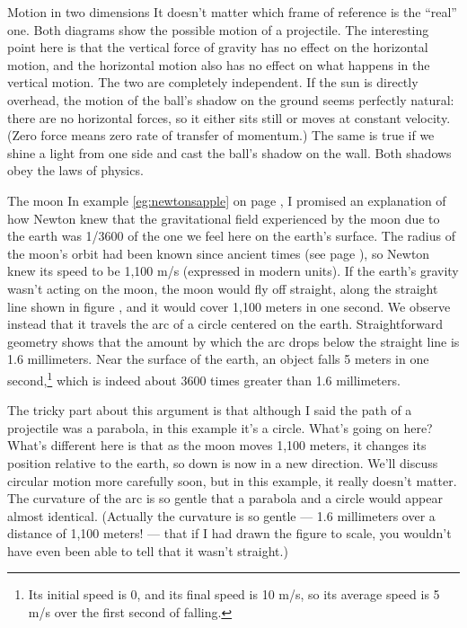 \begin{envsubsection}{Motion in two dimensions}
It doesn't matter which frame of reference is the ``real'' one. Both diagrams
show the possible motion of a projectile. The interesting point here is that the vertical
force of gravity has no effect on the horizontal motion, and the horizontal motion also
has no effect on what happens in the vertical motion. The two are completely independent.
If the sun is directly overhead, the motion of the ball's shadow on the ground seems perfectly
natural: there are no horizontal forces, so it either sits still or moves at constant
velocity. (Zero force means zero rate of transfer of momentum.) The same is true if we shine
a light from one side and cast the ball's shadow on the wall. Both shadows obey the laws
of physics.

\begin{eg}{The moon}\label{eg:moonorbit}
In example \ref{eg:newtonsapple} on page \pageref{eg:newtonsapple}, I promised an
explanation of how Newton knew that the gravitational field experienced by the moon
due to the earth was 1/3600 of the one we feel here on the earth's surface.
The radius of the moon's orbit had been known since ancient times
(see page \pageref{hipparchusmoondistance}), 
so Newton knew its speed to be 1,100 m/s (expressed in modern units).
If the earth's gravity wasn't acting on the moon, the moon would fly off straight,
along the straight line shown in figure , and it
would cover 1,100 meters in one second. We observe instead
that it travels the arc of a circle centered on the earth. Straightforward
geometry shows that the amount by which the arc drops below the straight line
is 1.6 millimeters. Near the surface of the earth, an object falls 5 meters
in one second,\footnote{Its initial speed is 0, and its final speed is 10 m/s, so its
average speed is 5 m/s over the first second of falling.} which is
indeed about 3600 times greater than 1.6 millimeters.

\vfill\pagebreak[4]

The tricky part about this argument is that although I said the path of a projectile
was a parabola, in this example it's a circle. What's going on here? What's different
here is that as the moon moves 1,100 meters, it changes its position relative to the
earth, so down is now in a new direction. We'll discuss circular motion more
carefully soon, but in this example, it really doesn't matter. The curvature of the
arc is so gentle that a parabola and a circle would appear almost identical. (Actually
the curvature is so gentle --- 1.6 millimeters over a distance of 1,100 meters! --- that
if I had drawn the figure to scale, you wouldn't have even been able to tell that it
wasn't straight.)


\end{eg}
\end{envsubsection}

